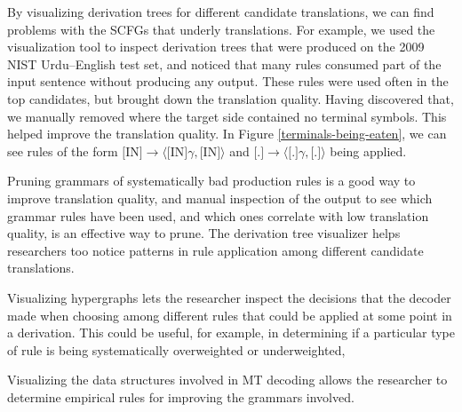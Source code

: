 \documentclass[nologo]{pbml}
\begin{document}
By visualizing derivation trees for different candidate translations, we
can find problems with the SCFGs that underly translations.
For example, we used the visualization tool to inspect derivation trees that were produced on the 2009 NIST
Urdu--English test set,
and noticed that many rules consumed part of the input sentence without producing any
output.  These rules were used often in the top candidates, but brought
down the translation quality. Having discovered that, we manually removed %
where the target side contained no terminal symbols.
This helped improve the translation quality.
In Figure \ref{terminals-being-eaten}, we can see rules of the form
$\textrm{[IN]} \to \langle \textrm{[IN]}\gamma,\textrm{[IN]}\rangle$ and
$\textrm{[.]} \to \langle \textrm{[.]}\gamma, \textrm{[.]}\rangle$ being
applied.

Pruning grammars of systematically bad production rules is a good way to
improve translation quality, and manual inspection of the output to see which
grammar rules have been used, and which ones correlate with low translation
quality, is an effective way to prune.
The derivation tree visualizer helps researchers too notice patterns in rule
application among different candidate translations.

Visualizing hypergraphs lets the researcher inspect the decisions that the
decoder made when choosing among different rules that could be applied at some
point in a derivation. This could be useful, for example, in determining if
a particular type of rule is being systematically overweighted or underweighted,

Visualizing the data structures involved in MT decoding allows the researcher
to determine empirical rules for improving the grammars involved.


%
\end{document}
